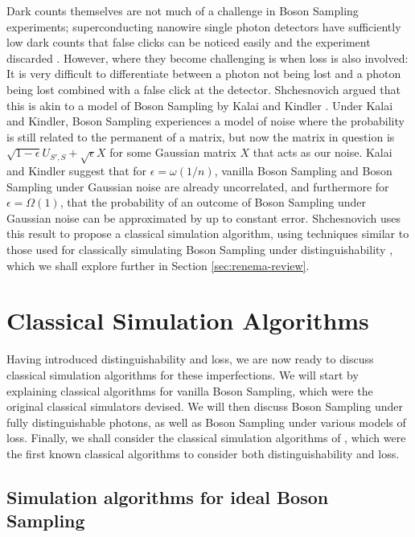 Dark counts themselves are not much of a challenge in Boson Sampling experiments; superconducting nanowire single photon detectors have sufficiently low dark counts that false clicks can be noticed easily and the experiment discarded \cite{kitaygorsky2005}. However, where they become challenging is when loss is also involved: It is very difficult to differentiate between a photon not being lost and a photon being lost combined with a false click at the detector. Shchesnovich \cite{shchesnovich2019} argued that this is akin to a model of Boson Sampling by Kalai and Kindler \cite{kalai2014}. Under Kalai and Kindler, Boson Sampling experiences a model of noise where the probability is still related to the permanent of a matrix, but now  the matrix in question is $\sqrt{1-\epsilon}U_{S',S}+\sqrt{\epsilon}X$ for some Gaussian matrix $X$ that acts as our noise. Kalai and Kindler suggest that for $\epsilon=\omega(1/n)$, vanilla Boson Sampling and Boson Sampling under Gaussian noise are already uncorrelated, and furthermore for $\epsilon = \Omega(1)$, that the probability of an outcome of Boson Sampling under Gaussian noise can be approximated by up to constant error. Shchesnovich \cite{shchesnovich2019} uses this result to propose a classical simulation algorithm, using techniques similar to those used for classically simulating Boson Sampling under distinguishability \cite{renema2018, renema2018loss}, which we shall explore further in Section \ref{sec:renema-review}.

\section{Classical Simulation Algorithms}
\label{sec:classical-simulations}

Having introduced distinguishability and loss, we are now ready to discuss classical simulation algorithms for these imperfections. We will start by explaining classical algorithms for vanilla Boson Sampling, which were the original classical simulators devised. We will then discuss Boson Sampling under fully distinguishable photons, as well as Boson Sampling under various models of loss. Finally, we shall consider the classical simulation algorithms of \cite{renema2018, renema2018loss}, which were the first known classical algorithms to consider both distinguishability and loss.

\subsection{Simulation algorithms for ideal Boson Sampling}

